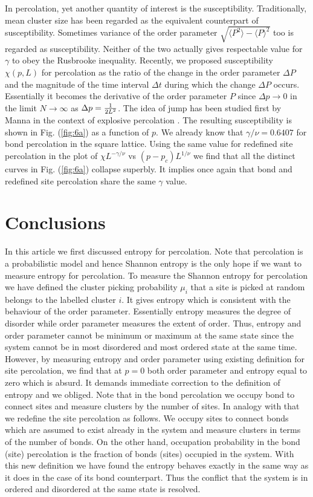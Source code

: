 \documentclass[twocolumn,showpacs,preprintnumbers,amsmath,amssymb]{article}
\begin{document}
In percolation, yet another quantity of interest is the susceptibility. 
Traditionally, mean cluster size
has been regarded as the equivalent counterpart of susceptibility. Sometimes variance of the order parameter $\sqrt{\langle P^2\rangle -\langle P\rangle^2}$ too is
regarded as susceptibility. Neither of the two actually gives respectable value for $\gamma$ to obey the
Rusbrooke inequality. Recently, we proposed susceptibility $\chi(p,L)$ for percolation as
the ratio of the change
in the order parameter $\Delta P$  and the magnitude of the time interval $\Delta t$ during which 
the change $\Delta P$  occurs.  Essentially it becomes the derivative of the order parameter $P$ since
$\Delta p\rightarrow 0$ in the limit  $N\rightarrow \infty$ as $\Delta p={{1}\over{2L^2}}$. The idea
of jump has been studied first by Manna in the context of explosive percolation \cite{ref.manna}.
 The resulting susceptibility is shown
in Fig. (\ref{fig:6a}) as a function of $p$. We already know that $\gamma/\nu=0.6407$ for 
bond percolation in the square lattice. Using the same value for redefined
site percolation in the plot of $\chi L^{-\gamma/\nu}$ vs $(p-p_c)L^{1/\nu}$ 
we find that all the distinct curves in Fig. (\ref{fig:6a}) collapse superbly. It implies
once again that bond and redefined site percolation share the same $\gamma$ value.



\section{Conclusions}

In this article we first discussed entropy for percolation. Note that percolation
is a probabilistic model and hence Shannon entropy is the only hope if we want to measure entropy 
for percolation. To measure the Shannon entropy for percolation we 
have defined the cluster picking probability $\mu_i$ that a site is picked at random belongs to
the labelled cluster $i$. It gives entropy which is consistent with the behaviour 
of the order parameter. Essentially entropy measures 
the degree of disorder while order parameter measures the extent of order. Thus, entropy and order parameter cannot be minimum or maximum 
at the same state since the system cannot be in most disordered and most ordered state at the same time.
However, by measuring entropy and order parameter using existing definition for site percolation, we find
that at $p=0$ both order parameter and entropy equal 
to zero which is absurd. It demands immediate correction to the definition of entropy and we obliged. 
Note that in the bond percolation we occupy bond to connect sites and measure clusters by the
number of sites. In analogy with that we redefine the site percolation as follows. We occupy sites to connect 
bonds which are assumed to exist already in the system and measure clusters in terms of the number of bonds. On the other hand, occupation probability in the bond (site) percolation is the fraction of bonds (sites) occupied
in the system. With this new definition we have found the entropy behaves exactly in the same way as 
it does in the case of its bond counterpart. Thus the conflict that the system is in ordered and disordered 
at the same state is resolved. 
\end{document}
